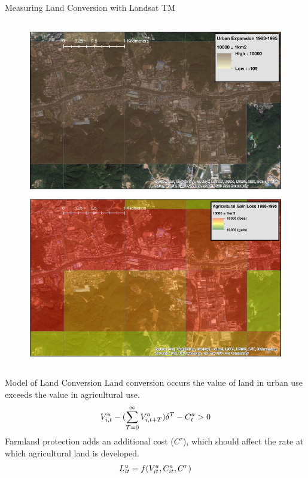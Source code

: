 \documentclass[newPxFont]{beamer}
\begin{document}
\begin{frame}[c]{Measuring Land Conversion with Landsat TM}
\begin{columns}
\begin{column}{.6\linewidth}
\begin{figure}
				\includegraphics[width=.8\linewidth]{CompareHighestResi.eps}
			\end{figure}
		\end{column}
	\end{columns}
\end{frame}


\begin{frame}{Model of Land Conversion}
	Land conversion occurs the value of land in urban use exceeds the value in agricultural use.
	\begin{equation}{\label{eq1}}
	V_{i,t}^{u}-(\sum\limits_{T=0}^{\infty}V_{i,t+T}^{a})\delta^{T}-C_{t}^{a}>0   
	\end{equation}
	Farmland protection adds an additional cost ($C^{\tau}$), which should affect the rate at which agricultural land is developed.
	\begin{equation}{\label{eq2}}
	L_{it}^{u}=f(V_{it}^{a},C_{it}^{a},C^{\tau})
	\end{equation}
\end{frame}

\end{document}
